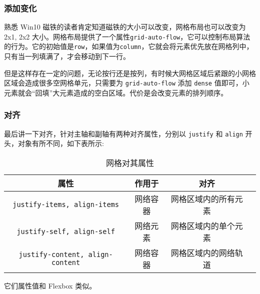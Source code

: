 \subsubsection*{添加变化}

熟悉 Win10 磁铁的读者肯定知道磁铁的大小可以改变，网格布局也可以改变为 2x1, 2x2 大小。网格布局提供了一个属性\texttt{grid-auto-flow}，它可以控制布局算法的行为。它的初始值是\texttt{row}，如果值为\texttt{column}，它就会将元素优先放在网格列中，只有当一列填满了，才会移动到下一行。

但是这样存在一定的问题，无论按行还是按列，有时候大网格区域后紧跟的小网格区域会造成很多空网格单元，只需要为 \texttt{grid-auto-flow} 添加 \texttt{dense} 值即可，小元素就会“回填”大元素造成的空白区域。代价是会改变元素的排列顺序。

\subsubsection*{对齐}

最后讲一下对齐，针对主轴和副轴有两种对齐属性，分别以 \texttt{justify} 和 \texttt{align} 开头，对象有所不同，如下表所示:

\begin{table}[H]
    \centering
    \caption{网格对其属性}
    \label{table:网格对其属性}
    \setlength{\tabcolsep}{4mm}
    \begin{tabular}{c|ccc}
        \toprule
        \textbf{属性} & \textbf{作用于} & \textbf{对齐} \\
        \midrule
        \texttt{justify-items, align-items} & 网络容器 & 网格区域内的所有元素 \\
        \texttt{justify-self, align-self} & 网络元素 & 网格区域内的单个元素 \\
        \texttt{justify-content, align-content} & 网络容器 & 网格区域内的网络轨道 \\
        \bottomrule
    \end{tabular}
\end{table}

它们属性值和 Flexbox 类似。

\newpage